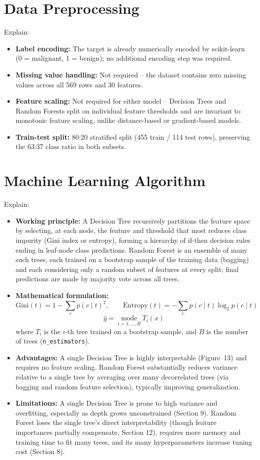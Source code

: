 \documentclass[12pt,a4paper]{article}
\begin{document}
\section{Data Preprocessing}
Explain:
\begin{itemize}
\item \textbf{Label encoding:} The target is already numerically encoded by scikit-learn
(0 = malignant, 1 = benign); no additional encoding step was required.
\item \textbf{Missing value handling:} Not required -- the dataset contains zero missing
values across all 569 rows and 30 features.
\item \textbf{Feature scaling:} Not required for either model -- Decision Trees and Random
Forests split on individual feature thresholds and are invariant to monotonic feature
scaling, unlike distance-based or gradient-based models.
\item \textbf{Train-test split:} 80:20 stratified split (455 train / 114 test rows),
preserving the 63:37 class ratio in both subsets.
\end{itemize}

\section{Machine Learning Algorithm}
Explain:
\begin{itemize}
\item \textbf{Working principle:} A Decision Tree recursively partitions the feature space by
selecting, at each node, the feature and threshold that most reduces class impurity (Gini
index or entropy), forming a hierarchy of if-then decision rules ending in leaf-node class
predictions. Random Forest is an ensemble of many such trees, each trained on a bootstrap
sample of the training data (bagging) and each considering only a random subset of features
at every split; final predictions are made by majority vote across all trees.
\item \textbf{Mathematical formulation:}
$$\text{Gini}(t) = 1 - \sum_{c} p(c\mid t)^2, \qquad
\text{Entropy}(t) = -\sum_{c} p(c\mid t)\log_2 p(c\mid t)$$
$$\hat{y} = \operatorname*{mode}_{i=1,\dots,B} T_i(x)$$
where $T_i$ is the $i$-th tree trained on a bootstrap sample, and $B$ is the number of trees
(\texttt{n\_estimators}).
\item \textbf{Advantages:} A single Decision Tree is highly interpretable (Figure~13) and
requires no feature scaling. Random Forest substantially reduces variance relative to a
single tree by averaging over many decorrelated trees (via bagging and random feature
selection), typically improving generalization.
\item \textbf{Limitations:} A single Decision Tree is prone to high variance and overfitting,
especially as depth grows unconstrained (Section 9). Random Forest loses the single tree's
direct interpretability (though feature importances partially compensate, Section 12),
requires more memory and training time to fit many trees, and its many hyperparameters
increase tuning cost (Section 8).
\end{itemize}
\end{document}
